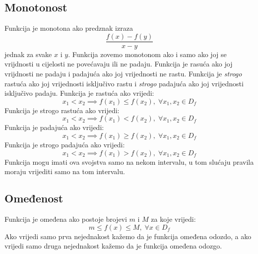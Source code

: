 \subsection{Monotonost \label{mono}}
    Funkcija je monotona ako predznak izraza
    \[\frac{f(x) - f(y)}{x - y}\]
    jednak za svake \(x\) i \(y\).
    Funkcija zovemo monotonom ako i samo ako joj se vrijdnosti u cijelosti ne povećavaju ili ne padaju.
    Funkcija je rasuća ako joj vrijdnosti ne padaju i padajuća ako joj vrijednosti ne rastu.
    Funkcija je \emph{strogo} rastuća ako joj vrijednosti isključivo rastu i \emph{strogo} padajuća ako joj vrijednosti isključivo padaju.
    Funkcija je rastuća ako vrijedi:
    \[x_1 < x_2 \implies f(x_1) \leq f(x_2),\; \forall x_1, x_2 \in D_f\]
    Funkcija je strogo rastuća ako vrijedi:
    \[x_1 < x_2 \implies f(x_1) < f(x_2),\; \forall x_1, x_2 \in D_f\]
    Funkcija je padajuća ako vrijedi:
    \[x_1 < x_2 \implies f(x_1) \geq f(x_2),\; \forall x_1, x_2 \in D_f\]
    Funkcija je strogo padajuća ako vrijedi:
    \[x_1 < x_2 \implies f(x_1) > f(x_2),\; \forall x_1, x_2 \in D_f\]
    Funkcija mogu imati ova svojstva samo na nekom intervalu, u tom slućaju pravila moraju vrijediti samo na tom intervalu.

\subsection{Omeđenost}
    Funkcija je omeđena ako postoje brojevi \(m\) i \(M\) za koje vrijedi:
    \[m \leq f(x) \leq M,\; \forall x \in D_f\]
    Ako vrijedi samo prva nejednakost kažemo da je funkcija omeđena odozdo, a ako vrijedi samo druga nejednakost kažemo da je funkcija omeđena odozgo.

